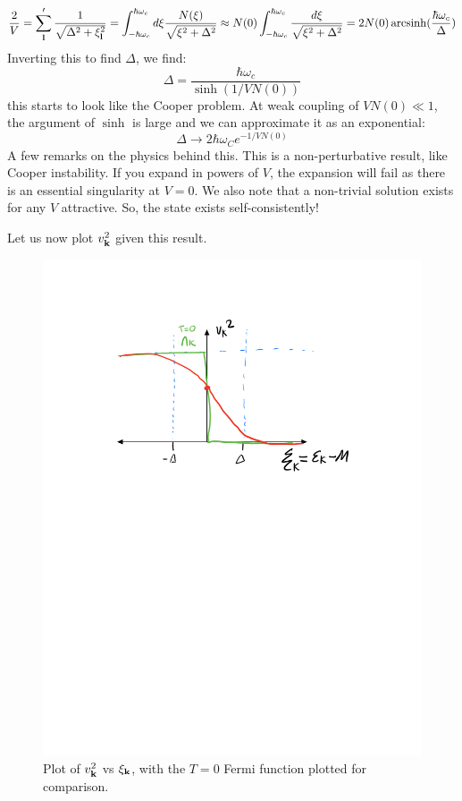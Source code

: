 \begin{equation}
    \frac{2}{V} = \sum_{\mathbf{l}}' \frac{1}{\sqrt{\Delta^2 + \xi_{\mathbf{l}}^2}} = \int_{-\hbar\omega_c}^{\hbar\omega_c} d\xi \frac{N(\xi)}{\sqrt{\xi^2 + \Delta^2}} \approx N(0)\int_{-\hbar\omega_c}^{\hbar\omega_c} \frac{d\xi}{\sqrt{\xi^2 + \Delta^2}} = 2N(0)\operatorname{arcsinh}(\frac{\hbar\omega_c}{\Delta})
\end{equation}
Inverting this to find $\Delta$, we find:
\begin{equation}
    \Delta = \frac{\hbar\omega_c}{\sinh(1/VN(0))}
\end{equation}
this starts to look like the Cooper problem. At weak coupling of $VN(0) \ll 1$, the argument of $\sinh$ is large and we can approximate it as an exponential:
\begin{equation}
    \Delta \to 2\hbar \omega_C e^{-1/VN(0)}
\end{equation}
A few remarks on the physics behind this. This is a non-perturbative result, like Cooper instability. If you expand in powers of $V$, the expansion will fail as there is an essential singularity at $V = 0$. We also note that a non-trivial solution exists for any $V$ attractive. So, the state exists self-consistently!

Let us now plot $v_{\mathbf{k}}^2$ given this result.

\begin{figure}[htbp]
    \centering
    \includegraphics[]{Images/fig-vksquareplotbcs.pdf}
    \caption{Plot of $v_{\mathbf{k}}^2$ vs $\xi_{\mathbf{k}}$, with the $T = 0$ Fermi function plotted for comparison.}
    \label{fig-vksquareplotbcs}
\end{figure}

